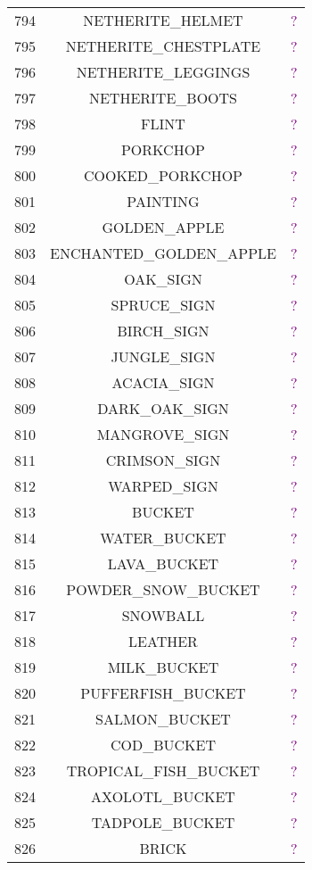\documentclass[11pt]{article}
\newcommand\myworries[1]{\textcolor{purple}{#1}}
\begin{document}
\begin{longtable}{ |c|c|c| }
	794 & NETHERITE\_HELMET & \myworries{?} \\
	795 & NETHERITE\_CHESTPLATE & \myworries{?} \\
	796 & NETHERITE\_LEGGINGS & \myworries{?} \\
	797 & NETHERITE\_BOOTS & \myworries{?} \\
	798 & FLINT & \myworries{?} \\
	799 & PORKCHOP & \myworries{?} \\
	800 & COOKED\_PORKCHOP & \myworries{?} \\
	801 & PAINTING & \myworries{?} \\
	802 & GOLDEN\_APPLE & \myworries{?} \\
	803 & ENCHANTED\_GOLDEN\_APPLE & \myworries{?} \\
	804 & OAK\_SIGN & \myworries{?} \\
	805 & SPRUCE\_SIGN & \myworries{?} \\
	806 & BIRCH\_SIGN & \myworries{?} \\
	807 & JUNGLE\_SIGN & \myworries{?} \\
	808 & ACACIA\_SIGN & \myworries{?} \\
	809 & DARK\_OAK\_SIGN & \myworries{?} \\
	810 & MANGROVE\_SIGN & \myworries{?} \\
	811 & CRIMSON\_SIGN & \myworries{?} \\
	812 & WARPED\_SIGN & \myworries{?} \\
	813 & BUCKET & \myworries{?} \\
	814 & WATER\_BUCKET & \myworries{?} \\
	815 & LAVA\_BUCKET & \myworries{?} \\
	816 & POWDER\_SNOW\_BUCKET & \myworries{?} \\
	817 & SNOWBALL & \myworries{?} \\
	818 & LEATHER & \myworries{?} \\
	819 & MILK\_BUCKET & \myworries{?} \\
	820 & PUFFERFISH\_BUCKET & \myworries{?} \\
	821 & SALMON\_BUCKET & \myworries{?} \\
	822 & COD\_BUCKET & \myworries{?} \\
	823 & TROPICAL\_FISH\_BUCKET & \myworries{?} \\
	824 & AXOLOTL\_BUCKET & \myworries{?} \\
	825 & TADPOLE\_BUCKET & \myworries{?} \\
	826 & BRICK & \myworries{?} \\

\end{longtable}
\end{document}

